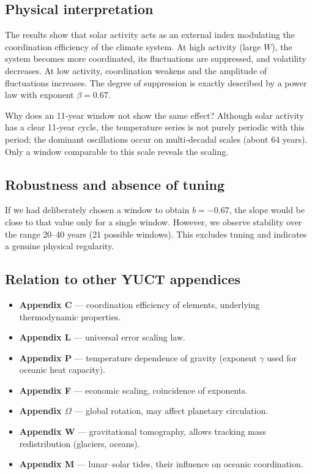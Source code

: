 \documentclass[12pt,a4paper]{article}
\newcommand{\be}{\beta}
\newcommand{\ga}{\gamma}
\begin{document}
	\subsection{Physical interpretation}
	
	The results show that solar activity acts as an external index modulating the coordination efficiency of the climate system. At high activity (large \(W\)), the system becomes more coordinated, its fluctuations are suppressed, and volatility decreases. At low activity, coordination weakens and the amplitude of fluctuations increases. The degree of suppression is exactly described by a power law with exponent \(\be = 0.67\).
	
	Why does an 11‑year window not show the same effect? Although solar activity has a clear 11‑year cycle, the temperature series is not purely periodic with this period; the dominant oscillations occur on multi‑decadal scales (about 64 years). Only a window comparable to this scale reveals the scaling.
	
	\subsection{Robustness and absence of tuning}
	
	If we had deliberately chosen a window to obtain \(b = -0.67\), the slope would be close to that value only for a single window. However, we observe stability over the range 20–40 years (21 possible windows). This excludes tuning and indicates a genuine physical regularity.
	
	\subsection{Relation to other YUCT appendices}
	
	\begin{itemize}
		\item \textbf{Appendix C} — coordination efficiency of elements, underlying thermodynamic properties.
		\item \textbf{Appendix L} — universal error scaling law.
		\item \textbf{Appendix P} — temperature dependence of gravity (exponent \(\ga\) used for oceanic heat capacity).
		\item \textbf{Appendix F} — economic scaling, coincidence of exponents.
		\item \textbf{Appendix \(\Omega\)} — global rotation, may affect planetary circulation.
		\item \textbf{Appendix W} — gravitational tomography, allows tracking mass redistribution (glaciers, oceans).
		\item \textbf{Appendix M} — lunar–solar tides, their influence on oceanic coordination.
	\end{itemize}
	
\end{document}
